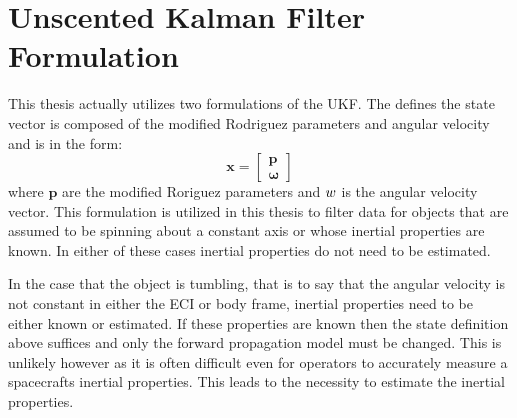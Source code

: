 \chapter{Unscented Kalman Filter Formulation}

This thesis actually utilizes two formulations of the UKF. The defines the state vector is composed of the modified Rodriguez parameters and angular velocity and is in the form:
\begin{equation}
\bm{x} = \begin{bmatrix} \bm{p} \\ \bm{\omega} \end{bmatrix}
\end{equation}
where $\bm{p}$ are the modified Roriguez parameters and  $\boldmath{w}$ is the angular velocity vector. This formulation is utilized in this thesis to filter data for objects that are assumed to be spinning about a constant axis or whose inertial properties are known. In either of these cases inertial properties do not need to be estimated.

In the case that the object is tumbling, that is to say that the angular velocity is not constant in either the ECI or body frame, inertial properties need to be either known or estimated. If these properties are known then the state definition above suffices and only the forward propagation model must be changed. This is unlikely however as it is often difficult even for operators to accurately measure a spacecrafts inertial properties. This leads to the necessity to estimate the inertial properties.


